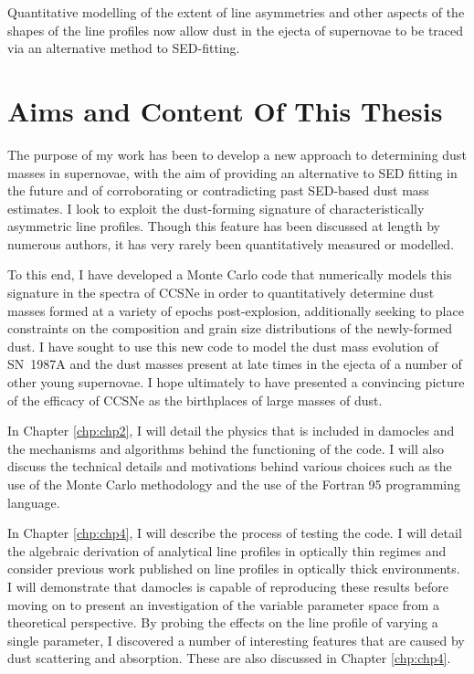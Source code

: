Quantitative modelling of the extent of line asymmetries and other aspects of the shapes of the line profiles now allow dust in the ejecta of supernovae to be traced via an alternative method to SED-fitting.  

\section{Aims and Content Of This Thesis}
The purpose of my work has been to develop a new approach to determining dust masses in supernovae, with the aim of providing an alternative to SED fitting in the future and of corroborating or contradicting past SED-based dust mass estimates.  I look to exploit the dust-forming signature of characteristically asymmetric line profiles.  Though this feature has been discussed at length by numerous authors, it has very rarely been quantitatively measured or modelled.

To this end, I have developed a Monte Carlo  code that numerically models this signature in the spectra of CCSNe in order to quantitatively determine dust masses formed at a variety of epochs post-explosion, additionally seeking to place constraints on the composition and grain size distributions of the newly-formed dust. I have sought to use this new code to model the dust mass evolution  of SN~1987A and the dust masses present at late times in the ejecta of a number of other young supernovae.  I hope ultimately to have presented a convincing picture of the efficacy of CCSNe as the birthplaces of large masses of dust.

In Chapter \ref{chp:chp2}, I will detail the physics that is included in {\sc damocles} and the mechanisms and algorithms behind the functioning of the code.  I will also discuss the technical details and motivations behind various choices such as the use of the Monte Carlo methodology and the use of the Fortran 95 programming language.  

In Chapter \ref{chp:chp4}, I will describe the process of testing the code.  I will detail the algebraic derivation of analytical line profiles in optically thin regimes and consider previous work published on line profiles in optically thick environments.  I will demonstrate that {\sc damocles} is capable of reproducing these results before moving on to present an investigation of the variable parameter space from a theoretical perspective.  By probing the effects on the line profile of varying a single parameter, I discovered a number of interesting features that are caused by dust scattering and absorption.  These are also discussed in Chapter \ref{chp:chp4}.  


